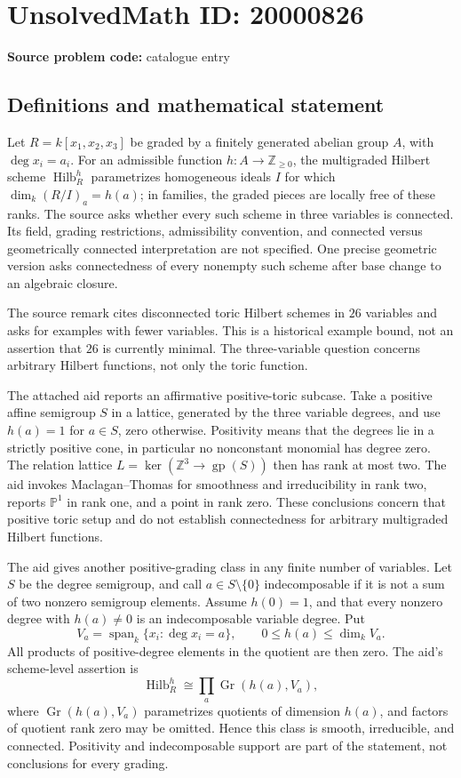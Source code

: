 \documentclass[11pt]{article}
\newcommand{\Z}{\mathbb{Z}}
\newcommand{\PP}{\mathbb{P}}
\begin{document}
\section*{UnsolvedMath ID: 20000826}
\textbf{Source problem code:} catalogue entry
\subsection{Definitions and mathematical statement}
Let \(R=k[x_1,x_2,x_3]\) be graded by a finitely generated abelian group \(A\), with \(\deg x_i=a_i\). For an admissible function \(h:A\to\Z_{\geq0}\), the multigraded Hilbert scheme \(\operatorname{Hilb}^h_R\) parametrizes homogeneous ideals \(I\) for which \(\dim_k(R/I)_a=h(a)\); in families, the graded pieces are locally free of these ranks. The source asks whether every such scheme in three variables is connected. Its field, grading restrictions, admissibility convention, and connected versus geometrically connected interpretation are not specified. One precise geometric version asks connectedness of every nonempty such scheme after base change to an algebraic closure.

The source remark cites disconnected toric Hilbert schemes in \(26\) variables and asks for examples with fewer variables. This is a historical example bound, not an assertion that \(26\) is currently minimal. The three-variable question concerns arbitrary Hilbert functions, not only the toric function.

The attached aid reports an affirmative positive-toric subcase. Take a positive affine semigroup \(S\) in a lattice, generated by the three variable degrees, and use \(h(a)=1\) for \(a\in S\), zero otherwise. Positivity means that the degrees lie in a strictly positive cone, in particular no nonconstant monomial has degree zero. The relation lattice \(L=\ker(\Z^3\to\operatorname{gp}(S))\) then has rank at most two. The aid invokes Maclagan--Thomas for smoothness and irreducibility in rank two, reports \(\PP^1\) in rank one, and a point in rank zero. These conclusions concern that positive toric setup and do not establish connectedness for arbitrary multigraded Hilbert functions.

The aid gives another positive-grading class in any finite number of variables. Let \(S\) be the degree semigroup, and call \(a\in S\setminus\{0\}\) indecomposable if it is not a sum of two nonzero semigroup elements. Assume \(h(0)=1\), and that every nonzero degree with \(h(a)\ne0\) is an indecomposable variable degree. Put
\[
V_a=\operatorname{span}_k\{x_i:\deg x_i=a\},\qquad
0\leq h(a)\leq\dim_kV_a.
\]
All products of positive-degree elements in the quotient are then zero. The aid's scheme-level assertion is
\[
\operatorname{Hilb}^h_R\cong\prod_a\operatorname{Gr}(h(a),V_a),
\]
where \(\operatorname{Gr}(h(a),V_a)\) parametrizes quotients of dimension \(h(a)\), and factors of quotient rank zero may be omitted. Hence this class is smooth, irreducible, and connected. Positivity and indecomposable support are part of the statement, not conclusions for every grading.
\end{document}
